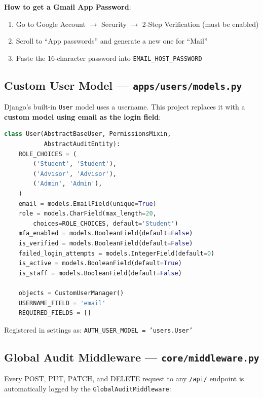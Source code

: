 \documentclass[12pt, a4paper]{article}
\begin{document}
\textbf{How to get a Gmail App Password}:
\begin{enumerate}
    \item Go to Google Account $\rightarrow$ Security $\rightarrow$ 2-Step Verification (must be enabled)
    \item Scroll to ``App passwords'' and generate a new one for ``Mail''
    \item Paste the 16-character password into \texttt{EMAIL\_HOST\_PASSWORD}
\end{enumerate}

\subsection{Custom User Model --- \texttt{apps/users/models.py}}

Django's built-in \texttt{User} model uses a username. This project replaces it with a \textbf{custom model using email as the login field}:

\begin{lstlisting}[language=Python, caption={Custom User Model}]
class User(AbstractBaseUser, PermissionsMixin,
           AbstractAuditEntity):
    ROLE_CHOICES = (
        ('Student', 'Student'),
        ('Advisor', 'Advisor'),
        ('Admin', 'Admin'),
    )
    email = models.EmailField(unique=True)
    role = models.CharField(max_length=20,
        choices=ROLE_CHOICES, default='Student')
    mfa_enabled = models.BooleanField(default=False)
    is_verified = models.BooleanField(default=False)
    failed_login_attempts = models.IntegerField(default=0)
    is_active = models.BooleanField(default=True)
    is_staff = models.BooleanField(default=False)

    objects = CustomUserManager()
    USERNAME_FIELD = 'email'
    REQUIRED_FIELDS = []
\end{lstlisting}

Registered in settings as: \texttt{AUTH\_USER\_MODEL = 'users.User'}

\subsection{Global Audit Middleware --- \texttt{core/middleware.py}}

Every POST, PUT, PATCH, and DELETE request to any \texttt{/api/} endpoint is automatically logged by the \texttt{GlobalAuditMiddleware}:
\end{document}

